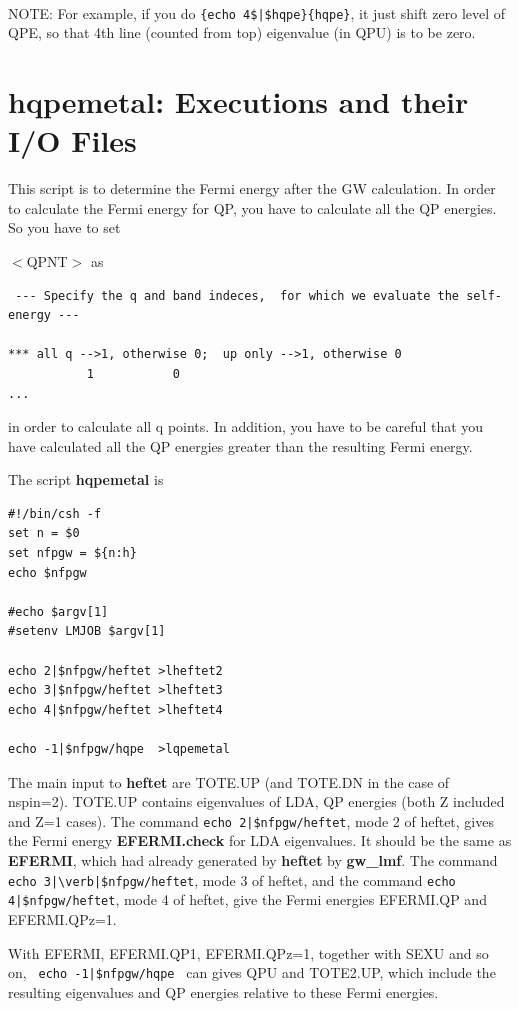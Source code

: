 \documentclass[a4paper,10pt,epsf,fleqn]{article}
\begin{document}
{ \

\noindent NOTE: For example, if you do \verb#{echo 4$|$hqpe}{hqpe}#, 
it just shift zero level of QPE, so that 4th line (counted from top) eigenvalue (in QPU) is to be zero.



\newpage
\section{{\bf hqpemetal}:  Executions and their I/O Files}
This script is to determine the Fermi energy after the GW calculation.
In order to calculate the Fermi energy for QP, 
you have to calculate all the QP energies.
So you have to set {$<$QPNT$>$ as
{\baselineskip=3mm
\begin{verbatim}
 --- Specify the q and band indeces,  for which we evaluate the self-energy ---

*** all q -->1, otherwise 0;  up only -->1, otherwise 0
           1           0
...
\end{verbatim}}
\noindent in order to calculate all q points. In addition, 
you have to be careful
that you have calculated all the QP energies greater
than the resulting Fermi energy.

The script {\bf hqpemetal} is
{
\baselineskip=3mm 
\begin{verbatim}
#!/bin/csh -f
set n = $0
set nfpgw = ${n:h}
echo $nfpgw

#echo $argv[1]
#setenv LMJOB $argv[1]

echo 2|$nfpgw/heftet >lheftet2
echo 3|$nfpgw/heftet >lheftet3
echo 4|$nfpgw/heftet >lheftet4

echo -1|$nfpgw/hqpe  >lqpemetal
\end{verbatim}
}

The main input to {\bf heftet} are {\sf TOTE.UP} (and {\sf TOTE.DN} 
in the case of nspin=2).
{\sf TOTE.UP} contains eigenvalues of LDA, QP energies 
(both Z included and Z=1 cases).
The command \verb#echo 2|$nfpgw/heftet#, mode 2 of heftet,
gives the Fermi energy {\bf EFERMI.check} for LDA eigenvalues.
It should be the same as {\bf EFERMI}, which had already generated by 
{\bf heftet} by {\bf gw\_lmf}.
The command \verb#echo 3|\verb|$nfpgw/heftet#, mode 3 of heftet,
and the command \verb#echo 4|$nfpgw/heftet#, mode 4 of heftet,
give the Fermi energies EFERMI.QP and EFERMI.QPz=1.

With {\sf EFERMI, EFERMI.QP1, EFERMI.QPz=1}, together with
{\sf SEXU} and so on, \verb# echo -1|$nfpgw/hqpe # can gives
{\sf QPU} and {\sf TOTE2.UP}, which include the resulting eigenvalues 
and QP energies relative to these Fermi energies.



}}
\end{document}
